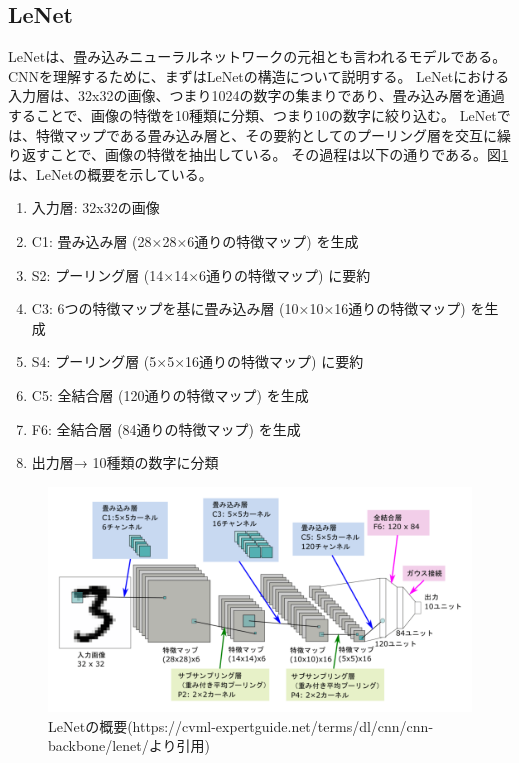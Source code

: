 \documentclass{ltjsarticle}
\begin{document}
\subsection{LeNet}
LeNetは、畳み込みニューラルネットワークの元祖とも言われるモデルである。CNNを理解するために、まずはLeNetの構造について説明する。
LeNetにおける入力層は、32x32の画像、つまり1024の数字の集まりであり、畳み込み層を通過することで、画像の特徴を10種類に分類、つまり10の数字に絞り込む。
LeNetでは、特徴マップである畳み込み層と、その要約としてのプーリング層を交互に繰り返すことで、画像の特徴を抽出している。
その過程は以下の通りである。図\ref{fig:lenet}は、LeNetの概要を示している。
\begin{enumerate}
  \item 入力層: 32x32の画像
  \item C1: 畳み込み層 (28×28×6通りの特徴マップ) を生成
  \item S2: プーリング層 (14×14×6通りの特徴マップ) に要約
  \item C3: 6つの特徴マップを基に畳み込み層 (10×10×16通りの特徴マップ) を生成
  \item S4: プーリング層 (5×5×16通りの特徴マップ) に要約
  \item C5: 全結合層 (120通りの特徴マップ) を生成
  \item F6: 全結合層 (84通りの特徴マップ) を生成
  \item 出力層→ 10種類の数字に分類
\end{enumerate}

  \begin{figure}[htbp]
    \centering
    \includegraphics[width=14cm]{./capture/LeNet.png}
    \caption{LeNetの概要(https://cvml-expertguide.net/terms/dl/cnn/cnn-backbone/lenet/より引用)}
    \label{fig:lenet}
\end{figure}
  
\newpage
\end{document}
